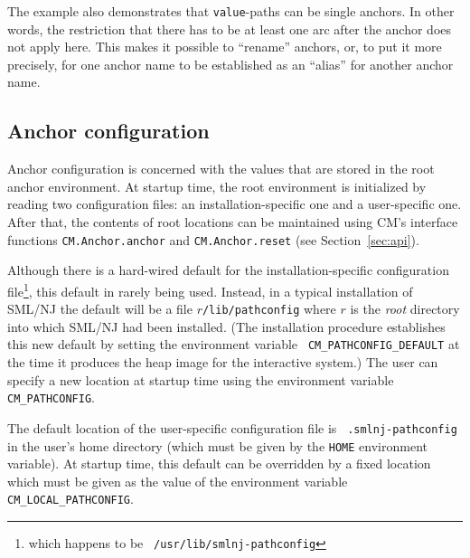\documentclass[titlepage,letterpaper]{article}
\begin{document}
The example also demonstrates that {\tt value}-paths can be single
anchors. In other words, the restriction that there has to be at least
one arc after the anchor does not apply here. This makes it possible
to ``rename'' anchors, or, to put it more precisely, for one anchor
name to be established as an ``alias'' for another anchor name.

\subsection{Anchor configuration}
\label{sec:anchor:config}

Anchor configuration is concerned with the values that are stored in
the root anchor environment.  At startup time, the root environment is
initialized by reading two configuration files: an
installation-specific one and a user-specific one.  After that, the
contents of root locations can be maintained using CM's interface
functions {\tt CM.Anchor.anchor} and {\tt CM.Anchor.reset} (see
Section~\ref{sec:api}).

Although there is a hard-wired default for the installation-specific
configuration file\footnote{which happens to be {\tt
/usr/lib/smlnj-pathconfig}}, this default in rarely being used.
Instead, in a typical installation of SML/NJ the default will be a
file $r${\tt /lib/pathconfig} where $r$ is the {\it root} directory
into which SML/NJ had been installed.  (The installation procedure
establishes this new default by setting the environment variable {\tt
CM\_PATHCONFIG\_DEFAULT} at the time it produces the heap image for
the interactive system.)  The user can specify a new location at
startup time using the environment variable {\tt CM\_PATHCONFIG}.

The default location of the user-specific configuration file is {\tt
.smlnj-pathconfig} in the user's home directory (which must be given
by the {\tt HOME} environment variable).  At startup time, this
default can be overridden by a fixed location which must be given as
the value of the environment variable {\tt CM\_LOCAL\_PATHCONFIG}.
\end{document}
